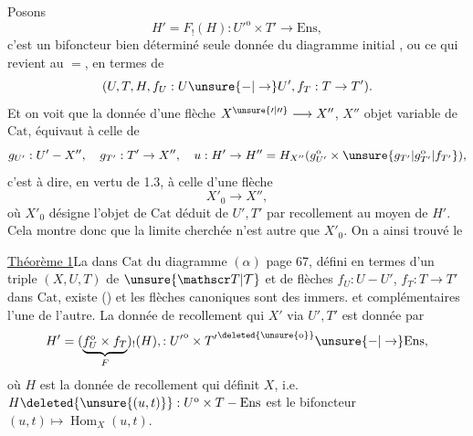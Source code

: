  Posons
\[
H'=F_!(H):{U'}^{\mathrm o}\times T'\to\mathrm{Ens},
\]
c'est un bifoncteur bien déterminé  
seule donnée du diagramme initial , ou
ce qui revient au $=$, en termes de
\[
(U,T,H,f_U:U\unsure{-|\to}U',f_T:T\to T').
\]
Et on voit que la donnée d'une flèche
$X^{\unsure{\prime|\prime\prime}}\longrightarrow X''$, $X''$ objet variable de $\mathrm{Cat}$, équivaut
à celle de
\[
g_{U'}:U'-X'',\quad g_{T'}:T'\to X'',\quad
u:H'\to H''=H_{X''}(g_{U'}^{\mathrm o}\times \unsure{g_{T'}|g_{T'}^{\mathrm o}|f_{T'}}),
\]
c'est à dire, en vertu de 1.3, à celle d'une
flèche
\[
X'_0\longrightarrow X'',
\]
où $X'_0$ désigne l'objet de $\mathrm{Cat}$ déduit
de \unsure{(}$U',T'$ par recollement au moyen de $H'$.
Cela montre donc que la limite 
cherchée n'est autre que $X'_0$. On a
ainsi trouvé le

\uline{Théorème 1}\quad La   dans $\mathrm{Cat}$ du
diagramme $(\alpha)$ page 67, défini en termes
d'un triple $(X,U,T)$ de $\unsure{\mathscr T|\mathcal T}$ et de flèches
$f_U:U-U'$, $f_T:T\to T'$ dans $\mathrm{Cat}$, existe ()
et les flèches canoniques
sont des immers.  et  complémentaires
l'une de l'autre. La donnée de recollement
qui  $X'$ via $U',T'$ est donnée par
\[
H'=(\underbrace{f_U^{\mathrm o}\times f_T}_{F})_!(H),:
{U'}^{\mathrm o}\times {T'}^{\deleted{\unsure{\mathrm o}}}\unsure{-|\to}\mathrm{Ens},
\]
où $H$ est la donnée de recollement qui définit
$X$, i.e. $H\deleted{\unsure{(u,t)}}:U^{\mathrm o}\times T-\mathrm{Ens}$ est le bifoncteur
$(u,t)\mapsto\operatorname{Hom}_X(u,t)$.

